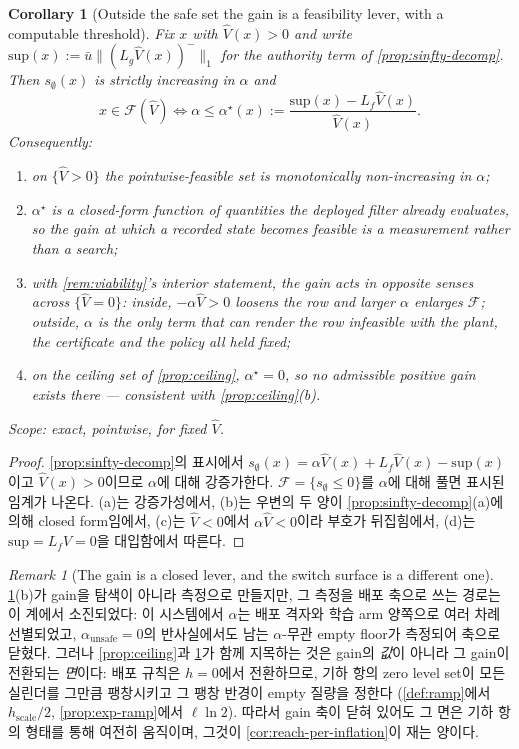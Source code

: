 \documentclass[11pt]{article}
\theoremstyle{plain}
\newtheorem{corollary}[theorem]{Corollary}
\theoremstyle{definition}
\theoremstyle{remark}
\newtheorem{remark}[theorem]{Remark}
\newcommand{\Vhat}{\widehat V}
\newcommand{\Lg}{L_g}
\newcommand{\Lf}{L_f}
\newcommand{\bignormone}[1]{\lVert#1\rVert_1}
\newcommand{\eqdef}{:=}
\begin{document}
\begin{corollary}[Outside the safe set the gain is a feasibility lever, with a computable threshold]\label{cor:alpha-thresh}
Fix $x$ with $\Vhat(x)>0$ and write $\mathrm{sup}(x)\eqdef\bar u\bignormone{(\Lg\Vhat(x))^-}$ for
the authority term of \cref{prop:sinfty-decomp}. Then $s_\emptyset(x)$ is strictly increasing in
$\alpha$ and
\begin{equation}
x\in\mathcal F(\Vhat)\iff\alpha\le\alpha^\star(x)\eqdef
\frac{\mathrm{sup}(x)-\Lf\Vhat(x)}{\Vhat(x)}.
\end{equation}
Consequently:
\begin{enumerate}[label=(\alph*)]
\item on $\{\Vhat>0\}$ the pointwise-feasible set is monotonically non-increasing in $\alpha$;
\item $\alpha^\star$ is a closed-form function of quantities the deployed filter already
evaluates, so the gain at which a \emph{recorded} state becomes feasible is a measurement rather
than a search;
\item with \cref{rem:viability}'s interior statement, the gain acts in opposite senses across
$\{\Vhat=0\}$: inside, $-\alpha\Vhat>0$ loosens the row and larger $\alpha$ enlarges
$\mathcal F$; outside, $\alpha$ is the only term that can render the row infeasible with the
plant, the certificate and the policy all held fixed;
\item on the ceiling set of \cref{prop:ceiling}, $\alpha^\star=0$, so no admissible positive gain
exists there --- consistent with \cref{prop:ceiling}(b).
\end{enumerate}
Scope: exact, pointwise, for fixed $\Vhat$.
\end{corollary}
\begin{proof}
\cref{prop:sinfty-decomp}의 표시에서 $s_\emptyset(x)=\alpha\Vhat(x)+\Lf\Vhat(x)-\mathrm{sup}(x)$이고
$\Vhat(x)>0$이므로 $\alpha$에 대해 강증가한다. $\mathcal F=\{s_\emptyset\le0\}$를
$\alpha$에 대해 풀면 표시된 임계가 나온다. (a)는 강증가성에서, (b)는 우변의 두 양이
\cref{prop:sinfty-decomp}(a)에 의해 closed form임에서, (c)는 $\Vhat<0$에서 $\alpha\Vhat<0$이라
부호가 뒤집힘에서, (d)는 $\mathrm{sup}=\Lf\Vhat=0$을 대입함에서 따른다.
\end{proof}

\begin{remark}[The gain is a closed lever, and the switch surface is a different one]\label{rem:alpha-closed}
\cref{cor:alpha-thresh}(b)가 gain을 탐색이 아니라 측정으로 만들지만, 그 측정을 배포 축으로 쓰는
경로는 이 계에서 소진되었다: 이 시스템에서 $\alpha$는 배포 격자와 학습 arm 양쪽으로 여러 차례
선별되었고, $\alpha_{\mathrm{unsafe}}=0$의 반사실에서도 남는 $\alpha$-무관 empty floor가 측정되어
축으로 닫혔다. 그러나 \cref{prop:ceiling}과 \cref{cor:alpha-thresh}가 함께 지목하는 것은 gain의
\emph{값}이 아니라 그 gain이 전환되는 \emph{면}이다: 배포 규칙은 $h=0$에서 전환하므로, 기하 항의
zero level set이 모든 실린더를 그만큼 팽창시키고 그 팽창 반경이 empty 질량을 정한다
(\cref{def:ramp}에서 $h_{\mathrm{scale}}/2$, \cref{prop:exp-ramp}에서 $\ell\ln2$). 따라서 gain 축이
닫혀 있어도 그 면은 기하 항의 형태를 통해 여전히 움직이며, 그것이
\cref{cor:reach-per-inflation}이 재는 양이다.
\end{remark}
\end{document}
